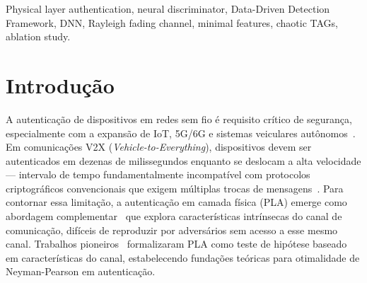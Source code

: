 \documentclass{sbrt}
\begin{document}
\begin{abstract}
This work proposes an optimal neural network-based discriminator for physical layer authentication with chaotic TAGs in Rayleigh fading channels, achieving detection probability more than 10 times superior to the classical method for signal-to-noise ratios below 5 dB. The method requires only two scalars per received packet (matched correlator and estimated channel gain), maintaining computational simplicity. An ablation study validates that this feature set is minimal and sufficient: any additional information degrades performance, confirming that the neural network captures the essential discriminatory information. We perform statistical validation to ensure that data satisfy independence and identical distribution assumptions, enabling application of the \textit{Data-Driven Detection Framework} (D3F) --- a method that constructs optimal detectors from data with theoretical guarantee of reliable performance using fewer simulations. Comparisons with linear SVM show that the gain stems from dynamic threshold adaptation by the neural network. Results establish a baseline in Rayleigh channels, with extension planned for V2X channels.
\end{abstract}

\begin{keywords}
Physical layer authentication, neural discriminator, Data-Driven Detection Framework, DNN, Rayleigh fading channel, minimal features, chaotic TAGs, ablation study.
\end{keywords}

\section{Introdução}

A autenticação de dispositivos em redes sem fio é requisito crítico de segurança, especialmente com a expansão de IoT, 5G/6G e sistemas veiculares autônomos~\cite{ref_xie}. Em comunicações V2X (\textit{Vehicle-to-Everything}), dispositivos devem ser autenticados em dezenas de milissegundos enquanto se deslocam a alta velocidade --- intervalo de tempo fundamentalmente incompatível com protocolos criptográficos convencionais que exigem múltiplas trocas de mensagens~\cite{ref_v2x_latency}. Para contornar essa limitação, a autenticação em camada física (PLA) emerge como abordagem complementar~\cite{ref_poor, ref_yu} que explora características intrínsecas do canal de comunicação, difíceis de reproduzir por adversários sem acesso a esse mesmo canal. Trabalhos pioneiros~\cite{ref_yu} formalizaram PLA como teste de hipótese baseado em características do canal, estabelecendo fundações teóricas para otimalidade de Neyman-Pearson em autenticação.
\end{document}

